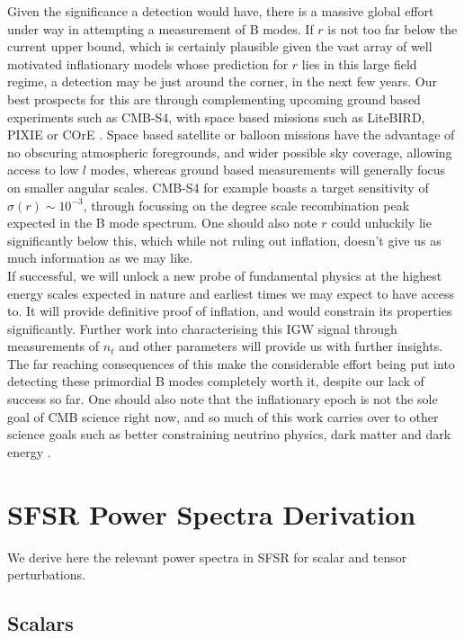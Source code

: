 \documentclass[a4paper,10pt]{article}
\begin{document}
Given the significance a detection would have, there is a massive global effort under way in attempting a measurement of B modes. If $r$ is not too far below the current upper bound, which is certainly plausible given the vast array of well motivated inflationary models whose prediction for $r$ lies in this large field regime, a detection may be just around the corner, in the next few years. Our best prospects for this are through complementing upcoming ground based experiments such as CMB-S4, with space based missions such as LiteBIRD, PIXIE or COrE \cite{S4}. Space based satellite or balloon missions have the advantage of no obscuring atmospheric foregrounds, and wider possible sky coverage, allowing access to low $l$ modes, whereas ground based measurements will generally focus on smaller angular scales. CMB-S4 for example boasts a target sensitivity of $\sigma(r) \sim 10^{-3}$, through focussing on the degree scale recombination peak expected in the B mode spectrum. One should also note $r$ could unluckily lie significantly below this, which while not ruling out inflation, doesn't give us as much information as we may like.\\

If successful, we will unlock a new probe of fundamental physics at the highest energy scales expected in nature and earliest times we may expect to have access to. It will provide definitive proof of inflation, and would constrain its properties significantly. Further work into characterising this IGW signal through measurements of $n_t$ and other parameters will provide us with further insights. The far reaching consequences of this make the considerable effort being put into detecting these primordial B modes completely worth it, despite our lack of success so far. One should also note that the inflationary epoch is not the sole goal of CMB science right now, and so much of this work carries over to other science goals such as better constraining neutrino physics, dark matter and dark energy \cite{S4}.




\appendix
\newpage

\section{SFSR Power Spectra Derivation}
\label{SFSRderivation}

We derive here the relevant power spectra in SFSR for scalar and tensor perturbations.
\subsection{Scalars}
\end{document}
